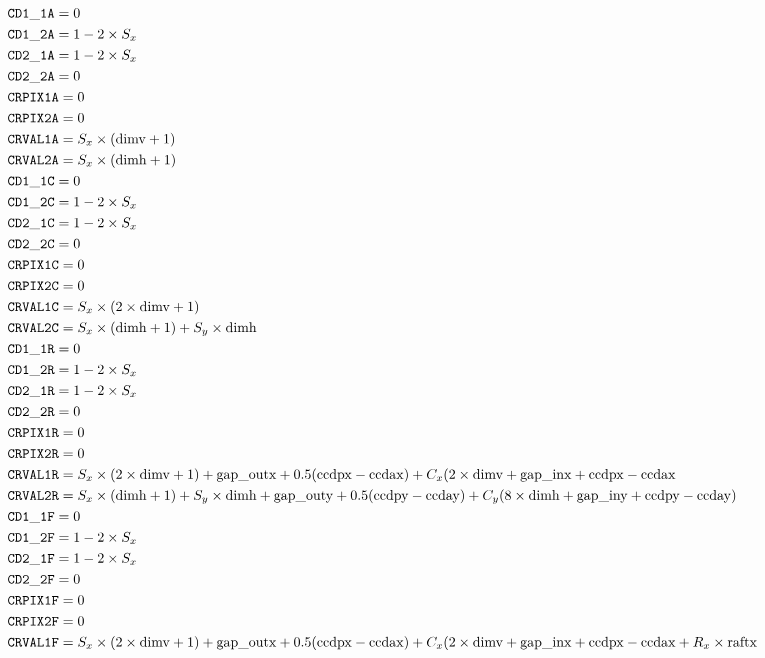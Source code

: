 \documentclass{article}[12pt]
\begin{document}
\begin{table}
\begin{align*}
& {\tt CD1\_1A} = 0 \\
& {\tt CD1\_2A} = 1 - 2 \times S_x \\
& {\tt CD2\_1A} = 1 - 2 \times S_x \\
& {\tt CD2\_2A} = 0 \\
& {\tt CRPIX1A} = 0 \\
& {\tt CRPIX2A} = 0 \\
& {\tt CRVAL1A }= S_x \times ({\rm dimv} + 1) \\
& {\tt CRVAL2A} = S_x \times ({\rm dimh} + 1) \\
& {\tt CD1\_1C} = 0  \\
& {\tt CD1\_2C} = 1 - 2 \times S_x \\
& {\tt CD2\_1C} = 1 - 2 \times S_x \\
& {\tt CD2\_2C} = 0 \\
& {\tt CRPIX1C} = 0 \\
& {\tt CRPIX2C} = 0 \\
& {\tt CRVAL1C} = S_x \times (2 \times {\rm dimv} + 1) \\
& {\tt CRVAL2C} = S_x \times ({\rm dimh} + 1) + S_y \times {\rm dimh}  \\
& {\tt CD1\_1R} = 0  \\
& {\tt CD1\_2R} = 1 - 2 \times S_x \\
& {\tt CD2\_1R} = 1 - 2 \times S_x \\
& {\tt CD2\_2R} = 0 \\
& {\tt CRPIX1R} = 0 \\
& {\tt CRPIX2R} = 0 \\
& {\tt CRVAL1R} = S_x \times (2 \times {\rm dimv} + 1) + {\rm gap\_outx} + 0.5({\rm ccdpx} - {\rm ccdax}) + C_x(2 \times {\rm dimv} + {\rm gap\_inx} + {\rm ccdpx} - {\rm ccdax} \\
& {\tt CRVAL2R} = S_x \times ({\rm dimh} + 1) + S_y \times {\rm dimh} +  {\rm gap\_outy} + 0.5({\rm ccdpy} - {\rm ccday}) + C_y ( 8 \times {\rm dimh} + {\rm gap\_iny} + {\rm ccdpy} - {\rm ccday}) \\
& {\tt CD1\_1F} = 0  \\
& {\tt CD1\_2F} = 1 - 2 \times S_x \\
& {\tt CD2\_1F} = 1 - 2 \times S_x \\
& {\tt CD2\_2F} = 0 \\
& {\tt CRPIX1F} = 0 \\
& {\tt CRPIX2F} = 0 \\
& {\tt CRVAL1F} = S_x \times (2 \times {\rm dimv} + 1) + {\rm gap\_outx} + 0.5({\rm ccdpx} - {\rm ccdax}) +  C_x(2 \times {\rm dimv} + {\rm gap\_inx} + {\rm ccdpx} - {\rm ccdax} +R_x \times {\rm raftx} \\

\end{align*}
\end{table}
\end{document}
